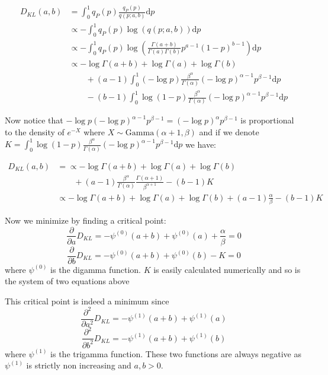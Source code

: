\documentclass{article}
\begin{document}
\begin{equation*}
\begin{split}
D_{KL}(a,b) & = \int_{0}^{1}q_P(p)\frac{q_P(p)}{q(p; a, b)}\mathrm{d}p \\
& \propto - \int_{0}^{1}q_P(p)\log(q(p; a, b))\mathrm{d}p \\
& \propto - \int_{0}^{1}q_P(p)\log(\frac{\Gamma(a+b)}{\Gamma(a)\Gamma(b)}p^{a-1}(1-p)^{b-1})\mathrm{d}p \\
& \propto -\log\Gamma(a+b) + \log\Gamma(a) + \log\Gamma(b) \\ & \qquad  + (a-1)\int_{0}^{1}(-\log p)\frac{\beta^\alpha}{\Gamma(\alpha)}(-\log p)^{\alpha-1}p^{\beta-1}\mathrm{d}p \\ & \qquad - (b-1)\int_{0}^{1}\log (1-p)\frac{\beta^\alpha}{\Gamma(\alpha)}(-\log p)^{\alpha-1}p^{\beta-1}\mathrm{d}p
\end{split}
\end{equation*}

Now notice that $-\log p(-\log p)^{\alpha-1}p^{\beta-1}= (-\log p)^{\alpha}p^{\beta-1}$ is proportional to the density of $e^{-X}$ where $X \sim \mathrm{Gamma}(\alpha+1, \beta)$ and if we denote $K=\int_{0}^{1}\log(1-p)\frac{\beta^\alpha}{\Gamma(\alpha)}(-\log p)^{\alpha-1}p^{\beta-1}\mathrm{d}p$ we have:

\begin{equation*}
\begin{split}
D_{KL}(a,b) & = \propto -\log\Gamma(a+b) + \log\Gamma(a) + \log\Gamma(b) \\ 
& \qquad  + (a-1)\frac{\beta^\alpha}{\Gamma(\alpha)}\frac{\Gamma(\alpha+1)}{\beta^{\alpha+1}} - (b-1)K \\
& \propto -\log\Gamma(a+b) + \log\Gamma(a) + \log\Gamma(b) + (a-1)\frac{\alpha}{\beta} - (b-1)K
\end{split}
\end{equation*}

Now we minimize by finding a critical point:
\begin{equation}
\frac{\partial }{\partial a}D_{KL} = -\psi^{(0)}(a+b) + \psi^{(0)}(a) + \frac{\alpha}{\beta} = 0
\end{equation}
\begin{equation}
\frac{\partial }{\partial b}D_{KL} = -\psi^{(0)}(a+b) + \psi^{(0)}(b) - K = 0
\end{equation}
where $\psi^{(0)}$ is the digamma function.
$K$ is easily calculated numerically and so is the system of two equations above

This critical point is indeed a minimum since 
\begin{equation}
\frac{\partial^2 }{\partial a^2}D_{KL} = -\psi^{(1)}(a+b) + \psi^{(1)}(a)
\end{equation}
\begin{equation}
\frac{\partial^2 }{\partial b^2}D_{KL} = -\psi^{(1)}(a+b) + \psi^{(1)}(b)
\end{equation}
where $\psi^{(1)}$ is the trigamma function. 
These two functions are always negative as $\psi^{(1)}$ is strictly non increasing and $a, b > 0$.
\end{document}
